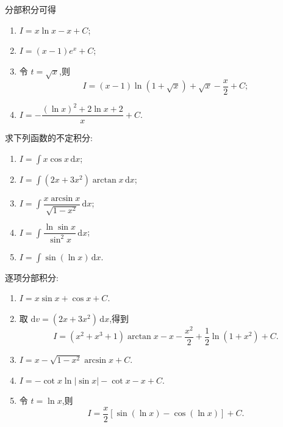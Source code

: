 \begin{solution}
    分部积分可得
    \begin{enumerate}
        \item $\displaystyle I=x\ln x-x+C$;
        \item $\displaystyle I=(x-1)e^x+C$;
        \item 令 $t=\sqrt{x}$,则
              \[
                  I=(x-1)\ln(1+\sqrt{x})+\sqrt{x}-\dfrac{x}{2}+C;
              \]
        \item $\displaystyle I=-\dfrac{(\ln x)^2+2\ln x+2}{x}+C$.
    \end{enumerate}
\end{solution}

\begin{example}
    求下列函数的不定积分:
    \begin{enumerate}
        \item $\displaystyle I=\int x\cos x\,\mathrm{d}x$;
        \item $\displaystyle I=\int(2x+3x^2)\arctan x\,\mathrm{d}x$;
        \item $\displaystyle I=\int\dfrac{x\arcsin x}{\sqrt{1-x^2}}\,\mathrm{d}x$;
        \item $\displaystyle I=\int\dfrac{\ln\sin x}{\sin^2x}\,\mathrm{d}x$;
        \item $\displaystyle I=\int\sin(\ln x)\,\mathrm{d}x$.
    \end{enumerate}
\end{example}
\exampleblank

\begin{solution}
    逐项分部积分:
    \begin{enumerate}
        \item $\displaystyle I=x\sin x+\cos x+C$.
        \item 取 $\mathrm{d}v=(2x+3x^2)\,\mathrm{d}x$,得到
              \[
                  I=(x^2+x^3+1)\arctan x-x-\dfrac{x^2}{2}
                  +\dfrac{1}{2}\ln(1+x^2)+C.
              \]
        \item $\displaystyle I=x-\sqrt{1-x^2}\arcsin x+C$.
        \item $\displaystyle I=-\cot x\ln|\sin x|-\cot x-x+C$.
        \item 令 $t=\ln x$,则
              \[
                  I=\dfrac{x}{2}[\sin(\ln x)-\cos(\ln x)]+C.
              \]
    \end{enumerate}
\end{solution}




